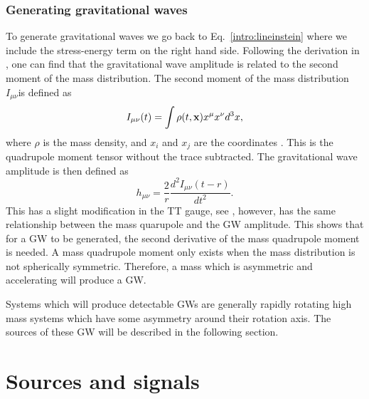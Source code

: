 \subsubsection{Generating gravitational waves}

To generate gravitational waves we go back to Eq.~\ref{intro:lineinstein} where we include the stress-energy term on the right hand side.
Following the derivation in \citep{flanagan2005BasicsGravitational}, one can find that the gravitational wave amplitude is related to the second moment of the mass distribution.
The second moment of the mass distribution $I_{\mu\nu}$is defined as
\begin{equation}
    I_{\mu \nu}(t) = \int \rho(t,{\bf x}) x^\mu x^\nu d^3x,
\end{equation}
where $\rho$ is the mass density, and $x_i$ and $x_j$ are the coordinates \citep{flanagan2005BasicsGravitational}. 
This is the quadrupole moment tensor without the trace subtracted.
The gravitational wave amplitude is then defined as
\begin{equation}
\label{intro:gravwave:amp}
    h_{\mu \nu} = \frac{2}{r}  \frac{d^2 I_{\mu \nu}(t-r)}{dt^2}.
\end{equation}
This has a slight modification in the TT gauge, see \citep{flanagan2005BasicsGravitational}, however, has the same relationship between the mass quarupole and the \gls{GW} amplitude.
This shows that for a \gls{GW} to be generated, the second derivative of the mass quadrupole moment is needed.
A mass quadrupole moment only exists when the mass distribution is not spherically symmetric.
Therefore, a mass which is asymmetric and accelerating will produce a \gls{GW}.

Systems which will produce detectable \glspl{GW} are generally rapidly rotating high mass systems which have some asymmetry around their rotation axis.
The sources of these \gls{GW} will be described in the following section.



\section{\label{intro:sources}Sources and signals}

